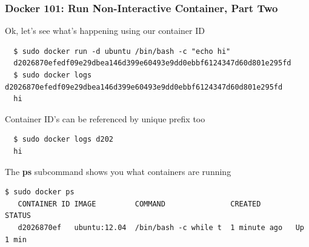 \documentclass[xcolor=dvipsnames]{beamer}
\begin{document}
\begin{frame}[fragile]
  \frametitle{Docker 101: Run Non-Interactive Container, Part Two}

  Ok, let's see what's happening using our container ID

  \begin{lstlisting}
  $ sudo docker run -d ubuntu /bin/bash -c "echo hi"
  d2026870efedf09e29dbea146d399e60493e9dd0ebbf6124347d60d801e295fd
  $ sudo docker logs d2026870efedf09e29dbea146d399e60493e9dd0ebbf6124347d60d801e295fd
  hi
  \end{lstlisting}

  Container ID's can be referenced by unique prefix too

  \begin{lstlisting}
  $ sudo docker logs d202
  hi
  \end{lstlisting}

  The \textbf{ps} subcommand shows you what containers are running

  \begin{lstlisting}[basicstyle=\tiny]
   $ sudo docker ps
   CONTAINER ID IMAGE         COMMAND               CREATED        STATUS    
   d2026870ef   ubuntu:12.04  /bin/bash -c while t  1 minute ago   Up 1 min  
  \end{lstlisting}    
\end{frame}
\end{document}
